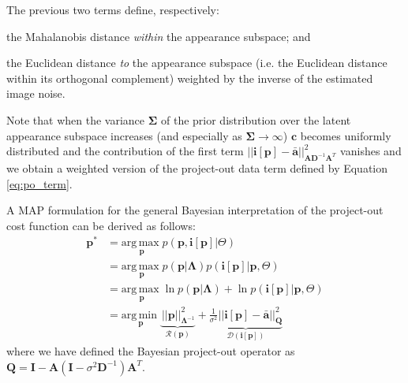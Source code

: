 The previous two terms define, respectively: 
\begin{inparaenum}
\item the Mahalanobis distance \emph{within} the appearance subspace; and 
\item the Euclidean distance \emph{to} the appearance subspace (i.e. the Euclidean distance within its orthogonal complement) weighted by the inverse of the estimated image noise.
\end{inparaenum} 
Note that when the variance $\mathbf{\Sigma}$ of the prior distribution over the latent appearance subspace increases (and especially as
$\mathbf{\Sigma} \rightarrow \infty$) $\mathbf{c}$ becomes uniformly distributed and the contribution of the first term $|| \mathbf{i}[\mathbf{p}] - \mathbf{\bar{a}} ||^2_{\mathbf{A}\mathbf{D}^{-1}\mathbf{A}^T}$ vanishes and we obtain a weighted version of the project-out data term defined by Equation \ref{eq:po_term}. 

A MAP formulation for the general Bayesian interpretation of the project-out cost function can be derived as follows:
\begin{equation}
    \begin{aligned}
        \mathbf{p}^* & = \underset{\mathbf{p}}{\mathrm{arg\,max\;}} p(\mathbf{p}, \mathbf{i}[\mathbf{p}] | \Theta) 
        \\
        & = \underset{\mathbf{p}}{\mathrm{arg\,max\;}}  p(\mathbf{p} | \mathbf{\Lambda})  p(\mathbf{i}[\mathbf{p}] |
        \mathbf{p}, \Theta)  
        \\
        & = \underset{\mathbf{p}}{\mathrm{arg\,max\;}}  \ln p(\mathbf{p} | \mathbf{\Lambda}) + \ln p(\mathbf{i}[\mathbf{p}] | \mathbf{p}, \Theta)
        \\
        & = \underset{\mathbf{p}}{\mathrm{arg\,min\;}}  \underbrace{\frac{}{} ||\mathbf{p}||^2_{\mathbf{\Lambda}^{-1}}}_{\mathcal{R}(\mathbf{p})} + \underbrace{\frac{1}{\sigma^2}|| \mathbf{i}[\mathbf{p}] - \mathbf{\bar{a}} ||^2_{\mathbf{Q}}}_{\mathcal{D}(\mathbf{i}[\mathbf{p}])}
    \end{aligned}
    \label{eq:prob_aam_fitting}
\end{equation}
where we have defined the Bayesian project-out operator as $\mathbf{Q} = \mathbf{I} - \mathbf{A}(\mathbf{I} - \sigma^2\mathbf{D}^{-1})\mathbf{A}^T$.
